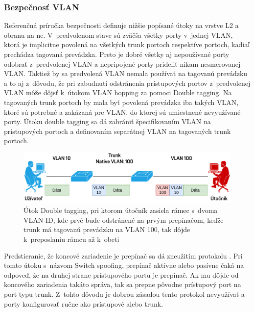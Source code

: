 \subsubsection*{Bezpečnosť VLAN}
Referenčná príručka bezpečnosti \cite{uYLsMtQInofenpV3} definuje nižšie popísané útoky na vrstve L2 a obranu na ne. V~predvolenom stave sú zväčša všetky porty v~jednej VLAN, ktorá je implicitne povolená na všetkých trunk portoch respektíve portoch, kadiaľ prechádza tagovaná prevádzka. Preto je dobré všetky aj nepoužívané porty odobrať z~predvolenej VLAN a nepripojené porty prideliť nikam nesmerovanej VLAN. Taktiež by sa predvolená VLAN nemala používať na tagovanú prevádzku a to aj z~dôvodu, že pri zabudnutí odstránenia prístupových portov z~predvolenej VLAN môže dôjsť k~útokom VLAN hopping za pomoci Double tagging. Na tagovaných trunk portoch by mala byť povolená prevádzka iba takých VLAN, ktoré sú potrebné a zakázaná pre VLAN, do ktorej sú umiestnené nevyužívané porty. Útoku double tagging sa dá zabrániť špecifikovaním VLAN na prístupových portoch a definovaním separátnej VLAN na tagovaných trunk portoch.

\begin{figure}[H]
	\begin{center}
		\includegraphics[scale=0.75]{obrazky/double-tagging.pdf}
	\end{center}
	\caption[VLAN Hopping s~Double Tagging]{Útok Double tagging, pri ktorom útočník zasiela rámec s~dvoma VLAN ID, kde prvé bude odstránené na prvým prepínačom, keďže trunk má tagovanú prevádzku na VLAN 100, tak dôjde k~preposlaniu rámcu až k~obeti \cite{srOo9OPXJxHjPBgo}}
	\label{fig:double-tagging}
\end{figure} 

Predstieranie, že koncové zariadenie je prepínač sa dá zneužitím protokolu  \cite{uYLsMtQInofenpV3}. Pri tomto útoku s~názvom Switch spoofing, prepínač aktívne alebo pasívne čaká na odpoveď, že na druhej strane prístupového portu je prepínač. Ak mu dôjde od koncového zariadenia takáto správa, tak sa prepne pôvodne prístupový port na port typu trunk. Z~tohto dôvodu je dobrou zásadou tento protokol nevyužívať a porty konfigurovať ručne ako prístupové alebo trunk.

